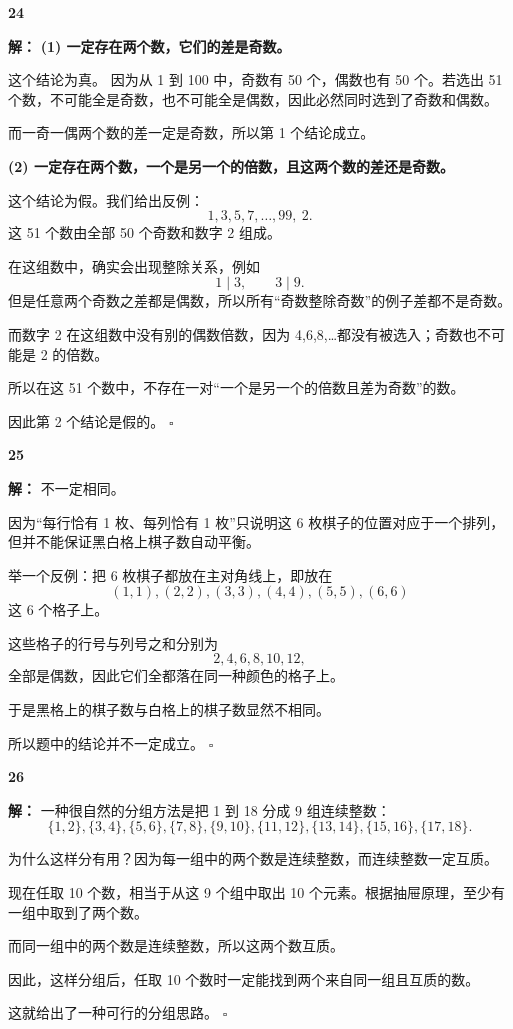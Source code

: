\documentclass[11pt,a4paper,fontset=fandol]{ctexart}
\theoremstyle{formalexample}
\newenvironment{solution}{\par\noindent\textbf{解：}}{\hfill$\square$\par}
\begin{document}
\textbf{24}\begin{solution}
\textbf{(1) 一定存在两个数，它们的差是奇数。}

这个结论为真。  
因为从 1 到 100 中，奇数有 50 个，偶数也有 50 个。若选出 51 个数，不可能全是奇数，也不可能全是偶数，因此必然同时选到了奇数和偶数。

而一奇一偶两个数的差一定是奇数，所以第 1 个结论成立。

\textbf{(2) 一定存在两个数，一个是另一个的倍数，且这两个数的差还是奇数。}

这个结论为假。我们给出反例：
\[
1,3,5,7,\ldots,99,\ 2.
\]
这 51 个数由全部 50 个奇数和数字 2 组成。

在这组数中，确实会出现整除关系，例如
\[
1\mid 3,\qquad 3\mid 9.
\]
但是任意两个奇数之差都是偶数，所以所有“奇数整除奇数”的例子差都不是奇数。

而数字 2 在这组数中没有别的偶数倍数，因为 4,6,8,\ldots 都没有被选入；奇数也不可能是 2 的倍数。

所以在这 51 个数中，不存在一对“一个是另一个的倍数且差为奇数”的数。

因此第 2 个结论是假的。
\end{solution}

\textbf{25}\begin{solution}
不一定相同。

因为“每行恰有 1 枚、每列恰有 1 枚”只说明这 6 枚棋子的位置对应于一个排列，但并不能保证黑白格上棋子数自动平衡。

举一个反例：把 6 枚棋子都放在主对角线上，即放在
\[
(1,1),(2,2),(3,3),(4,4),(5,5),(6,6)
\]
这 6 个格子上。

这些格子的行号与列号之和分别为
\[
2,4,6,8,10,12,
\]
全部是偶数，因此它们全都落在同一种颜色的格子上。

于是黑格上的棋子数与白格上的棋子数显然不相同。

所以题中的结论并不一定成立。
\end{solution}

\textbf{26}\begin{solution}
一种很自然的分组方法是把 1 到 18 分成 9 组连续整数：
\[
\{1,2\},\{3,4\},\{5,6\},\{7,8\},\{9,10\},\{11,12\},\{13,14\},\{15,16\},\{17,18\}.
\]

为什么这样分有用？因为每一组中的两个数是连续整数，而连续整数一定互质。

现在任取 10 个数，相当于从这 9 个组中取出 10 个元素。根据抽屉原理，至少有一组中取到了两个数。

而同一组中的两个数是连续整数，所以这两个数互质。

因此，这样分组后，任取 10 个数时一定能找到两个来自同一组且互质的数。

这就给出了一种可行的分组思路。
\end{solution}
\end{document}
